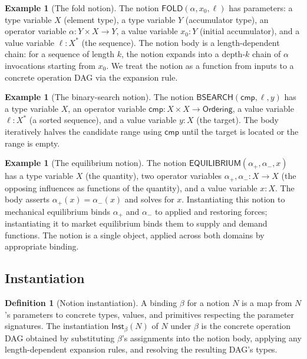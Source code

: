 \documentclass[11pt,a4paper]{article}
\theoremstyle{plain}
\theoremstyle{definition}
\newtheorem{definition}[theorem]{Definition}
\newtheorem{example}[theorem]{Example}
\theoremstyle{remark}
\newcommand{\Inst}{\mathsf{Inst}}
\begin{document}
\begin{example}[The fold notion]
\label{ex:fold-notion}
The notion $\mathsf{FOLD}(\alpha, x_0, \ell)$ has parameters: a type variable $X$ (element type), a type variable $Y$ (accumulator type), an operator variable $\alpha : Y \times X \to Y$, a value variable $x_0 : Y$ (initial accumulator), and a value variable $\ell : X^\ast$ (the sequence). The notion body is a length-dependent chain: for a sequence of length $k$, the notion expands into a depth-$k$ chain of $\alpha$ invocations starting from $x_0$. We treat the notion as a function from inputs to a concrete operation DAG via the expansion rule.
\end{example}

\begin{example}[The binary-search notion]
\label{ex:bsearch-notion}
The notion $\mathsf{BSEARCH}(\mathsf{cmp}, \ell, y)$ has a type variable $X$, an operator variable $\mathsf{cmp} : X \times X \to \mathsf{Ordering}$, a value variable $\ell : X^\ast$ (a sorted sequence), and a value variable $y : X$ (the target). The body iteratively halves the candidate range using $\mathsf{cmp}$ until the target is located or the range is empty.
\end{example}

\begin{example}[The equilibrium notion]
\label{ex:equilibrium-notion}
The notion $\mathsf{EQUILIBRIUM}(\alpha_+, \alpha_-, x)$ has a type variable $X$ (the quantity), two operator variables $\alpha_+, \alpha_- : X \to X$ (the opposing influences as functions of the quantity), and a value variable $x : X$. The body asserts $\alpha_+(x) = \alpha_-(x)$ and solves for $x$. Instantiating this notion to mechanical equilibrium binds $\alpha_+$ and $\alpha_-$ to applied and restoring forces; instantiating it to market equilibrium binds them to supply and demand functions. The notion is a single object, applied across both domains by appropriate binding.
\end{example}

\subsection{Instantiation}

\begin{definition}[Notion instantiation]
\label{def:instantiation}
A binding $\beta$ for a notion $N$ is a map from $N$'s parameters to concrete types, values, and primitives respecting the parameter signatures. The instantiation $\Inst_\beta(N)$ of $N$ under $\beta$ is the concrete operation DAG obtained by substituting $\beta$'s assignments into the notion body, applying any length-dependent expansion rules, and resolving the resulting DAG's types.
\end{definition}
\end{document}
